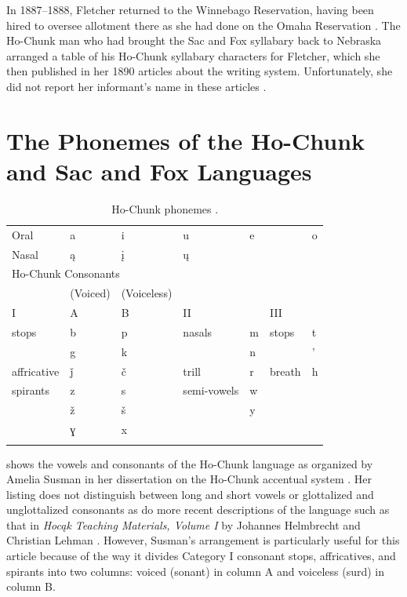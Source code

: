 \documentclass[output=paper]{LSP/langsci}
\begin{document}
In 1887--1888, Fletcher returned to the Winnebago Reservation, having been hired to oversee allotment there as she had done on the Omaha Reservation \citep[162]{Mark1988}. The Ho-Chunk man who had brought the Sac and Fox syllabary back to Nebraska arranged a table of his Ho-Chunk syllabary characters for Fletcher, which she then published in her 1890 articles about the writing system. Unfortunately, she did not report her informant's name in these articles \citep[300]{Fletcher1890a}.

\section{The Phonemes of the Ho-Chunk and Sac and Fox Languages}

\begin{table}
\begin{tabular}{lllllll}
\lsptoprule
\multicolumn{7}{l}{Ho-Chunk Vowels}\\
\midrule
Oral & a & i & u & e && o\\
Nasal & ą & į & ų\\
\midrule
\multicolumn{7}{l}{Ho-Chunk Consonants}\\
& (Voiced) & (Voiceless)\\
I & A & B & II & & III & \\
\midrule
stops & b & p & nasals & m & stops & t\\
& g & k && n && ' \\
affricative & ǰ & č & trill & r & breath & h\\
spirants & z & s & semi-vowels & w &&\\
& ž & š && y &&\\
& ɣ & x &&&&\\
\lspbottomrule
\end{tabular}
\caption{Ho-Chunk phonemes \citep[15]{Susman1943}.}
\label{hochunkphonemes}
\end{table}

 shows the vowels and consonants of the Ho-Chunk language as organized by Amelia Susman in her dissertation on the Ho-Chunk accentual system \citeyearpar[15]{Susman1943}. Her listing does not distinguish between long and short vowels or glottalized and unglottalized consonants as do more recent descriptions of the language such as that in \emph{Hoc\k{a}k Teaching Materials, Volume I} by Johannes Helmbrecht and Christian Lehman \citeyearpar[5--7]{HelmbrechtLehman2010}. However, Susman's arrangement is particularly useful for this article because of the way it divides Category I consonant stops, affricatives, and spirants into two columns: voiced (sonant) in column A and voiceless (surd) in column B. 
\end{document}
